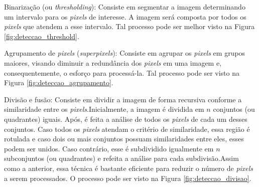 \documentclass[12pt,oneside,a4paper,chapter=TITLE,section=TITLE,sumario
		=tradicional]{abntex2}
\begin{document}
\begin{lista}
			\item Binarização (ou \textit{thresholding}): Consiste em segmentar a imagem determinando um intervalo para os \textit{pixels} de interesse. A imagem será composta por todos os \textit{pixels} que atendem a esse intervalo. Tal processo pode ser melhor visto na Figura \ref{fig:deteccao_threshold}.
			
			\begin{figure}[H]
				\hspace{2cm}
			\end{figure}
			
			\item Agrupamento de \textit{pixels} (\textit{superpixels}): Consiste em agrupar os \textit{pixels} em grupos maiores, visando diminuir a redundância dos \textit{pixels} em uma imagem e, consequentemente, o esforço para processá-la. Tal processo pode ser visto na Figura \ref{fig:deteccao_agrupamento}.
			
			\begin{figure}[H]
				\hspace{2cm}
			\end{figure}
			
			\item Divisão e fusão: Consiste em dividir a imagem de forma recursiva conforme a similaridade entre os \textit{pixels}.\hspace{0.1cm}Inicialmente, a imagem é dividida em $n$ conjuntos (ou quadrantes) iguais. Após, é feita a análise de todos os \textit{pixels} de cada um desses conjuntos. Caso todos os \textit{pixels} atendam o critério de similaridade, essa região é rotulada e caso dois ou mais conjuntos possuam similaridades entre eles, esses podem ser unidos. Caso contrário, esse é subdividido igualmente em $n$ subconjuntos (ou quadrantes) e refeita a análise para cada subdivisão.\hspace{0.1cm}Assim como a anterior, essa técnica é bastante eficiente para reduzir o número de \textit{pixels} a serem processados. O processo pode ser visto na Figura \ref{fig:deteccao_divisao}.
			

\end{lista}
\end{document}
